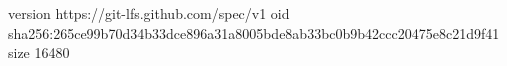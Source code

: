 version https://git-lfs.github.com/spec/v1
oid sha256:265ce99b70d34b33dce896a31a8005bde8ab33bc0b9b42ccc20475e8c21d9f41
size 16480

